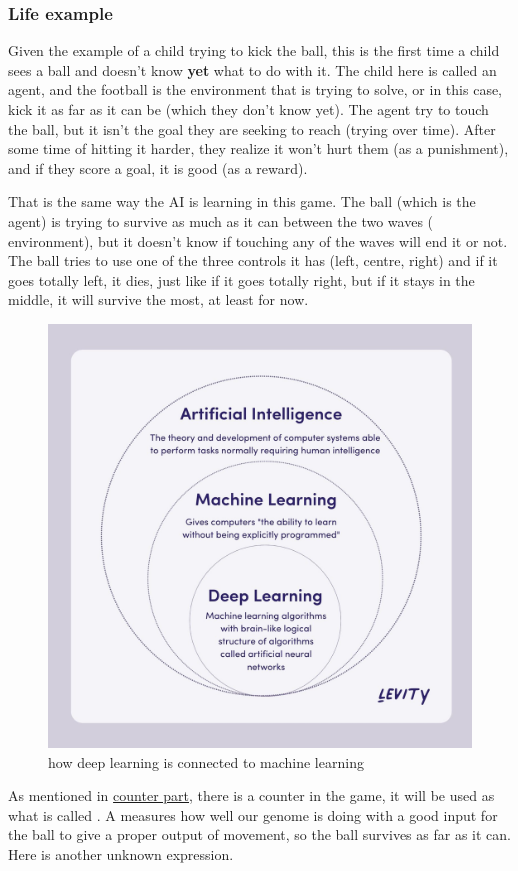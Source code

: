 \subsubsection{Life example}\label{sec:ai-life-example}
Given the example of a child trying to kick the ball, this is the first time a child sees a ball and doesn't know \textbf{yet} what to do with it. The child here is called an agent, and the football is the environment that is trying to solve, or in this case, kick it as far as it can be (which they don't know yet). The agent try to touch the ball, but it isn't the goal they are seeking to reach (trying over time). After some time of hitting it harder, they realize it won't hurt them (as a punishment), and if they score a goal, it is good (as a reward).

That is the same way the AI is learning in this game. The ball (which is the agent) is trying to survive as much as it can between the two waves ( environment), but it doesn't know if touching any of the waves will end it or not. The ball tries to use one of the three controls it has (left, centre, right) and if it goes totally left, it dies, just like if it goes totally right, but if it stays in the middle, it will survive the most, at least for now.

\begin{figure}[H]
	\centering
	\includegraphics[width=0.7\linewidth]{"usedImages/AI vs Machine Learning vs Deep Learning"}
	\caption{how deep learning is connected to machine learning}
	\label{fig:ai-vs-machine-learning-vs-deep-learning}
\end{figure}

As mentioned in \hyperref[display-score]{counter part}, there is a counter in the game, it will be used as what is called . A  measures how well our genome is doing with a good input for the ball to give a proper output of movement, so the ball survives as far as it can. Here is another unknown expression.
 
